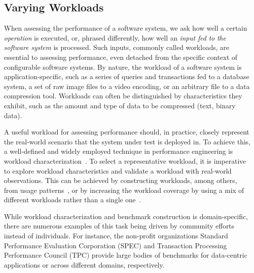 {\color{black}
\subsection{Varying Workloads}\label{sec:varying_workloads}
When assessing the performance of a software system, we ask how well a certain \textit{operation} is executed, or, phrased differently, how well an \textit{input fed to the software system} is processed. Such inputs, commonly called workloads, are essential to assessing performance, even detached from the specific context of configurable software systems. By nature, the workload of a software system is application-specific, such as a series of queries and transactions fed to a database system, a set of raw image files to a video encoding, or an arbitrary file to a data compression tool. Workloads can often be distinguished by characteristics they exhibit, such as the amount and type of data to be compressed (text, binary data).

A useful workload for assessing performance should, in practice, closely represent the real-world scenario that the system under test is deployed in. To achieve this, a well-defined and widely employed technique in performance engineering is workload characterization~\cite{ceesay2020,papadopoulos2021}. To select a representative workload, it is imperative to explore workload characteristics and validate a workload with real-world observations. This can be achieved by constructing workloads, among others, from usage patterns~\cite{calzarossa2016}, or by increasing the workload coverage by using a mix of different workloads rather than a single one~\cite{jiang2015survey}.

While workload characterization and benchmark construction is domain-specific, there are numerous examples of this task being driven by community efforts instead of individuals. For instance, the non-profit organizations Standard Performance Evaluation Corporation (SPEC) and Transaction Processing Performance Council (TPC) provide large bodies of benchmarks for data-centric applications or across different domains, respectively.
}
